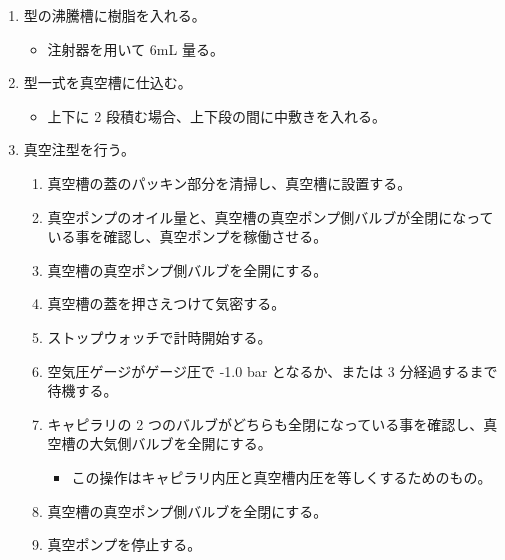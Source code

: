 \documentclass{ltjreport}
\begin{document}
\begin{enumerate}
\begin{enumerate}
		\item プラスチックカップにエポキシ樹脂の硬化剤を投入する。
		\begin{itemize}
			\item 主剤重量の 40\% の硬化剤を投入する。
		\end{itemize}
		\item 攪拌棒を用いて撹拌する。
		\begin{itemize}
			\item 3 分程度撹拌する。
			\item 撹拌中、気泡が入っても問題ない。
				真空引きしたとき結局発泡するので、撹拌時点で混入する気泡は気にする必要ない。
		\end{itemize}
	\end{enumerate}
	\item 型の沸騰槽に樹脂を入れる。
	\begin{itemize}
		\item \gls{注射器}を用いて 6mL 量る。
	\end{itemize}
	\item 型一式を真空槽に仕込む。
	\begin{itemize}
		\item 上下に 2 段積む場合、上下段の間に中敷きを入れる。
	\end{itemize}
	\item 真空注型を行う。
	\begin{enumerate}
		\item 真空槽の蓋のパッキン部分を清掃し、真空槽に設置する。
		\item 真空ポンプのオイル量と、真空槽の真空ポンプ側バルブが全閉になっている事を確認し、真空ポンプを稼働させる。
		\item 真空槽の真空ポンプ側バルブを全開にする。
		\item 真空槽の蓋を押さえつけて気密する。
		\item ストップウォッチで計時開始する。
		\item 空気圧ゲージがゲージ圧で -1.0 bar となるか、または 3 分経過するまで待機する。
		\item キャピラリの 2 つのバルブがどちらも全閉になっている事を確認し、真空槽の大気側バルブを全開にする。
		\begin{itemize}
			\item この操作はキャピラリ内圧と真空槽内圧を等しくするためのもの。
		\end{itemize}
		\item 真空槽の真空ポンプ側バルブを全閉にする。
		\item 真空ポンプを停止する。

\end{enumerate}
\end{enumerate}
\end{document}
